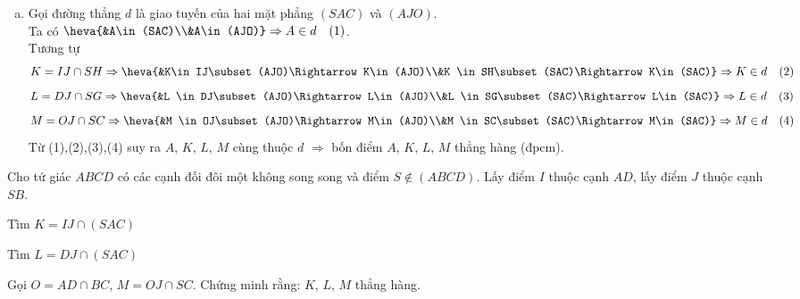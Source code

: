 \begin{bt}
\begin{bt}
{{\begin{tikzpicture}[scale=1, font=\footnotesize, line join=round, line cap=round, >=stealth]
		\end{tikzpicture}}
		\vspace{-1cm}
		\begin{enumerate}[c)]
			\item Gọi đường thẳng $d$ là giao tuyến của hai mặt phẳng $(SAC)$ và $(AJO)$.\\
			Ta có 
			$\heva{&A\in(SAC)\\&A\in(AJO)}\Rightarrow A\in d\quad (1)$.\\
			Tương tự
			$$K=IJ\cap SH \Rightarrow \heva{&K\in IJ\subset (AJO)\Rightarrow K\in(AJO)\\&K \in SH\subset (SAC)\Rightarrow K\in(SAC)}\Rightarrow K\in d\quad (2)$$
			$$L=DJ\cap SG \Rightarrow \heva{&L \in DJ\subset (AJO)\Rightarrow L\in(AJO)\\&L \in SG\subset (SAC)\Rightarrow L\in(SAC)}\Rightarrow L\in d\quad (3)$$
			$$M=OJ\cap SC \Rightarrow \heva{&M \in OJ\subset (AJO)\Rightarrow M\in(AJO)\\&M \in SC\subset (SAC)\Rightarrow M\in(SAC)}\Rightarrow M\in d\quad (4)$$
			Từ (1),(2),(3),(4) suy ra $A$, $K$, $L$, $M$ cùng thuộc $d$ $\Rightarrow$ bốn điểm $A$, $K$, $L$, $M$ thẳng hàng (đpcm).
		\end{enumerate}
	}
\end{bt}
\begin{bt}%
	Cho tứ giác $ABCD$ có các cạnh đối đôi một không song song và điểm $S\not\in(ABCD)$.
	Lấy điểm $I$ thuộc cạnh $AD$, lấy điểm $J$ thuộc cạnh $SB$.
	\begin{listEX}[2]
		\item Tìm $K=IJ\cap (SAC)$
		\item Tìm $L=DJ\cap (SAC)$
		\item* Gọi $O=AD\cap BC$, $M=OJ\cap SC$. Chứng minh rằng: $K$, $L$, $M$ thẳng hàng.
	\end{listEX}
\end{bt}
\end{bt}
